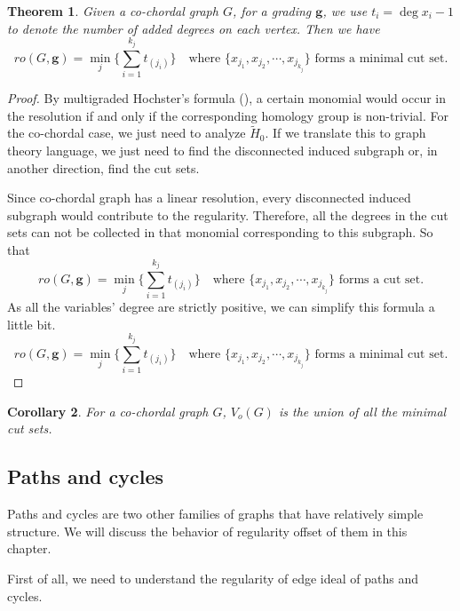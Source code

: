 \documentclass[dvipsnames,10pt]{article}
\newtheorem{theorem}{Theorem}[section]
\newtheorem{cor}[theorem]{Corollary}
\begin{document}
\begin{theorem}
Given a co-chordal graph $G$, for a grading $\mathbf{g}$, we use $t_i=\deg x_i-1$ to denote the number of added degrees on each vertex. Then we have
\begin{equation*}
    ro(G,\mathbf{g})=\min_{j}\{\sum_{i=1}^{k_j}t_{(j_i)}\}\quad \text{where $\{x_{j_1},x_{j_2},\cdots,x_{j_{k_j}}\}$ forms a minimal cut set.}
\end{equation*}
\end{theorem}
\begin{proof}
    By multigraded Hochster's formula (), a certain monomial would occur in the resolution if and only if the corresponding homology group is non-trivial. For the co-chordal case, we just need to analyze $\widetilde{H}_{0}$. If we translate this to graph theory language, we just need to find the disconnected induced subgraph or, in another direction, find the cut sets.

    Since co-chordal graph has a linear resolution, every disconnected induced subgraph would contribute to the regularity. Therefore, all the degrees in the cut sets can not be collected in that monomial corresponding to this subgraph. So that
    \begin{equation*}
      ro(G,\mathbf{g})=\min_{j}\{\sum_{i=1}^{k_j}t_{(j_i)}\}\quad \text{where $\{x_{j_1},x_{j_2},\cdots,x_{j_{k_j}}\}$ forms a cut set.}  
    \end{equation*}
    As all the variables' degree are strictly positive, we can simplify this formula a little bit.
    \begin{equation*}
        ro(G,\mathbf{g})=\min_{j}\{\sum_{i=1}^{k_j}t_{(j_i)}\}\quad \text{where $\{x_{j_1},x_{j_2},\cdots,x_{j_{k_j}}\}$ forms a minimal cut set.}
    \end{equation*}
\end{proof}
\begin{cor}
    For a co-chordal graph $G$, $V_o(G)$ is the union of all the minimal cut sets.
\end{cor}


\subsection{Paths and cycles}
Paths and cycles are two other families of graphs that have relatively simple structure. We will discuss the behavior of regularity offset of them in this chapter. 

First of all, we need to understand the regularity of edge ideal of paths and cycles.
\end{document}
